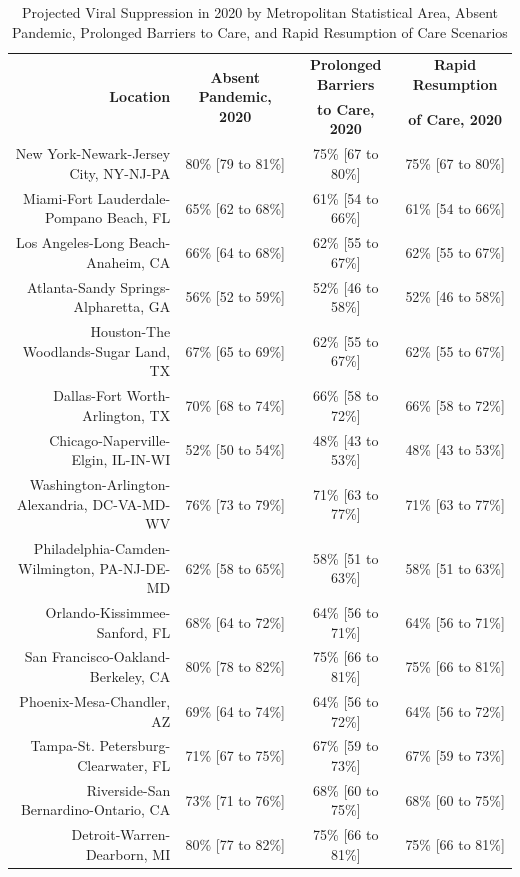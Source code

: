 \documentclass{article}
\begin{document}
\begin{table}[H]
	\caption{Projected Viral Suppression in 2020 by Metropolitan Statistical Area, Absent Pandemic, Prolonged Barriers to Care, and Rapid Resumption of Care Scenarios}
	\footnotesize
	\begin{tabular}{|r|c|c|c|}
		\hline
		\multirow{2}{*}{\textbf{Location}} & \multirow{2}{*}{\textbf{Absent Pandemic, 2020}} & \textbf{Prolonged Barriers} & \textbf{Rapid Resumption}\\
		&  & \textbf{to Care, 2020} & \textbf{of Care, 2020}\\
		\hline\hline
		New York-Newark-Jersey City, NY-NJ-PA & 80\% [79 to 81\%] & 75\% [67 to 80\%] & 75\% [67 to 80\%]\\
		Miami-Fort Lauderdale-Pompano Beach, FL & 65\% [62 to 68\%] & 61\% [54 to 66\%] & 61\% [54 to 66\%]\\
		Los Angeles-Long Beach-Anaheim, CA & 66\% [64 to 68\%] & 62\% [55 to 67\%] & 62\% [55 to 67\%]\\
		Atlanta-Sandy Springs-Alpharetta, GA & 56\% [52 to 59\%] & 52\% [46 to 58\%] & 52\% [46 to 58\%]\\
		Houston-The Woodlands-Sugar Land, TX & 67\% [65 to 69\%] & 62\% [55 to 67\%] & 62\% [55 to 67\%]\\
		Dallas-Fort Worth-Arlington, TX & 70\% [68 to 74\%] & 66\% [58 to 72\%] & 66\% [58 to 72\%]\\
		Chicago-Naperville-Elgin, IL-IN-WI & 52\% [50 to 54\%] & 48\% [43 to 53\%] & 48\% [43 to 53\%]\\
		Washington-Arlington-Alexandria, DC-VA-MD-WV & 76\% [73 to 79\%] & 71\% [63 to 77\%] & 71\% [63 to 77\%]\\
		Philadelphia-Camden-Wilmington, PA-NJ-DE-MD & 62\% [58 to 65\%] & 58\% [51 to 63\%] & 58\% [51 to 63\%]\\
		Orlando-Kissimmee-Sanford, FL & 68\% [64 to 72\%] & 64\% [56 to 71\%] & 64\% [56 to 71\%]\\
		San Francisco-Oakland-Berkeley, CA & 80\% [78 to 82\%] & 75\% [66 to 81\%] & 75\% [66 to 81\%]\\
		Phoenix-Mesa-Chandler, AZ & 69\% [64 to 74\%] & 64\% [56 to 72\%] & 64\% [56 to 72\%]\\
		Tampa-St. Petersburg-Clearwater, FL & 71\% [67 to 75\%] & 67\% [59 to 73\%] & 67\% [59 to 73\%]\\
		Riverside-San Bernardino-Ontario, CA & 73\% [71 to 76\%] & 68\% [60 to 75\%] & 68\% [60 to 75\%]\\
		Detroit-Warren-Dearborn, MI & 80\% [77 to 82\%] & 75\% [66 to 81\%] & 75\% [66 to 81\%]\\

\end{tabular}
\end{table}
\end{document}
